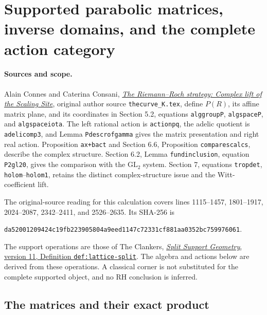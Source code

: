 \section{Supported parabolic matrices, inverse domains, and the complete action category}
\label{sec:supported-parabolic-action}

\paragraph{Sources and scope.}
Alain Connes and Caterina Consani,
\href{https://arxiv.org/abs/1805.10501v1}{\emph{The Riemann--Roch strategy:
Complex lift of the Scaling Site}}, original author source
\nolinkurl{thecurve_K.tex}, define $P(R)$, its affine matrix plane, and
its coordinates in Section 5.2, equations \texttt{alggroupP},
\texttt{algspaceP}, and \texttt{algspaceiota}. The left rational action
is \texttt{actionpq}, the adelic quotient is \texttt{adelicomp3},
and Lemma \texttt{Pdescrofgamma} gives the matrix presentation and
right real action. Proposition \texttt{ax+bact} and Section 6.6,
Proposition \texttt{comparescalcs}, describe the complex structure.
Section 6.2, Lemma \texttt{fundinclusion}, equation \texttt{P2gl20},
gives the comparison with the $\mathrm{GL}_2$ system. Section 7,
equations \texttt{tropdet}, \texttt{holom}--\texttt{holom1}, retains
the distinct complex-structure issue and the Witt-coefficient lift.

The original-source reading for this calculation covers lines
1115--1457, 1801--1917, 2024--2087, 2342--2411, and 2526--2635.
Its SHA-256 is
\begin{center}\small
\nolinkurl{da52001209424c19fb223905804a9eed1147c72331cf881aa0352bc759976061}.
\end{center}
The support operations are those of The Clankers,
\href{https://github.com/KokunoYumeto/zeta-function-research-reader/blob/a2851f9eb352e7e4376bc629de86fa4ed9c1c434/workbenches/splitzero-tandem/foundations/split-support-geometry-v11/split_support_geometry_arithmetic_curve_v11.tex#L1226}
{\emph{Split Support Geometry}, version 11, Definition
\texttt{def:lattice-split}}. The algebra and actions below are derived
from these operations. A classical corner is not substituted for the
complete supported object, and no RH conclusion is inferred.

\subsection{The matrices and their exact product}

